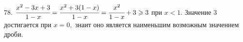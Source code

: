 78. $\cfrac{x^2-3x+3}{1-x}=\cfrac{x^2+3(1-x)}{1-x}=\cfrac{x^2}{1-x}+3\geqslant3$ при $x<1.$ Значение 3 достигается при $x=0,$ знаит оно является наименьшим возможным значением дроби.\\

